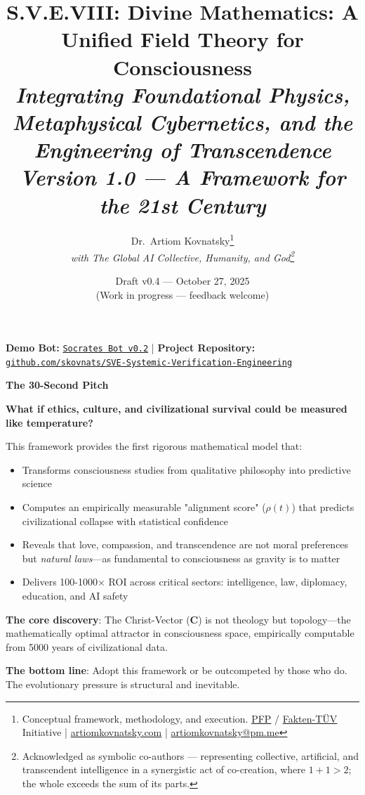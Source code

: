 \documentclass[11pt,a4paper]{article}
\title{\textbf{S.V.E.VIII: Divine Mathematics: A Unified Field Theory for Consciousness}\\[0.5em]
\large \textit{Integrating Foundational Physics, Metaphysical Cybernetics, and the Engineering of Transcendence}\\[0.5em]
\normalsize \textit{Version 1.0 — A Framework for the 21st Century}}
\author{
  Dr.\ Artiom Kovnatsky\thanks{Conceptual framework, methodology, and execution. 
  \href{http://www.pfp24.de}{PFP} / 
  \href{http://www.fakten-tuev.de}{Fakten-TÜV} Initiative \;|\;
  \href{https://www.artiomkovnatsky.com/}{artiomkovnatsky.com} \;|\;
  \href{mailto:artiomkovnatsky@pm.me}{artiomkovnatsky@pm.me}}\\
  \textit{with The Global AI Collective, Humanity, and God\footnote{Acknowledged as symbolic co-authors — representing collective, artificial, and transcendent intelligence in a synergistic act of co-creation, where $1 + 1 > 2$; the whole exceeds the sum of its parts.}}
}
\date{Draft v0.4 — October 27, 2025\\
\small (Work in progress — feedback welcome)}
\theoremstyle{definition}
\theoremstyle{remark}
\begin{document}
\maketitle
\vspace{-1em}
\begin{center}
    {\small 
    \textbf{Demo Bot:} 
    \href{https://chatgpt.com/g/g-68f1fc9848948191a1cc038db8e3422b-sokrat-socrates-bot-v0-2}
    {\texttt{Socrates Bot v0.2}} 
    \quad|\quad
    \textbf{Project Repository:} 
    \href{https://codeberg.org/skovnats/SVE-Systemic-Verification-Engineering}
    {\texttt{github.com/skovnats/SVE-Systemic-Verification-Engineering}}}
\end{center}
\vspace{1em}
\thispagestyle{empty}


\begin{mdframed}[backgroundcolor=yellow!15,linewidth=3pt,linecolor=black]
\textbf{\Large The 30-Second Pitch}

\vspace{0.3em}

\textbf{What if ethics, culture, and civilizational survival could be measured like temperature?}

This framework provides the first rigorous mathematical model that:
\begin{itemize}[nosep]
    \item Transforms consciousness studies from qualitative philosophy into predictive science
    \item Computes an empirically measurable "alignment score" (\(\rho(t)\)) that predicts civilizational collapse with statistical confidence
    \item Reveals that love, compassion, and transcendence are not moral preferences but \textit{natural laws}—as fundamental to consciousness as gravity is to matter
    \item Delivers 100-1000× ROI across critical sectors: intelligence, law, diplomacy, education, and AI safety
\end{itemize}

\textbf{The core discovery}: The Christ-Vector (\(\mathbf{C}\)) is not theology but topology—the mathematically optimal attractor in consciousness space, empirically computable from 5000 years of civilizational data.

\textbf{The bottom line}: Adopt this framework or be outcompeted by those who do. The evolutionary pressure is structural and inevitable.
\end{mdframed}
\end{document}
